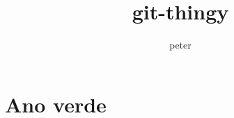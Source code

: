 \documentclass[12pt]{article}
\title{git-thingy}
\date{}
\author{peter}
\begin{document}
  \maketitle
  \tableofcontents
  \section{Ano verde}
    \blindtext
\end{document}
